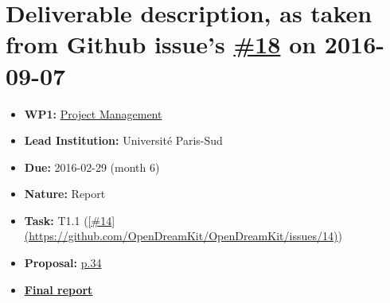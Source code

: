 \section*{\texorpdfstring{Deliverable description, as taken from Github
issue's
\href{https://github.com/OpenDreamKit/OpenDreamKit/issues/18}{\#18} on
2016-09-07}{Deliverable description, as taken from Github issue's \#18 on 2016-09-07}}\label{deliverable-description-as-taken-from-github-issues-18-on-2016-09-07}

\begin{itemize}
\tightlist
\item
  \textbf{WP1:}
  \href{https://github.com/OpenDreamKit/OpenDreamKit/tree/master/WP1}{Project
  Management}
\item
  \textbf{Lead Institution:} Université Paris-Sud
\item
  \textbf{Due:} 2016-02-29 (month 6)
\item
  \textbf{Nature:} Report
\item
  \textbf{Task:} T1.1
  (\href{https://github.com/OpenDreamKit/OpenDreamKit/issues/14}{{[}\#14{]}(https://github.com/OpenDreamKit/OpenDreamKit/issues/14)})
\item
  \textbf{Proposal:}
  \href{https://github.com/OpenDreamKit/OpenDreamKit/raw/master/Proposal/proposal-www.pdf}{p.34}
\item
  \textbf{\href{https://github.com/OpenDreamKit/OpenDreamKit/raw/master/WP1/D1.2/report-final.pdf}{Final
  report}}
\end{itemize}
